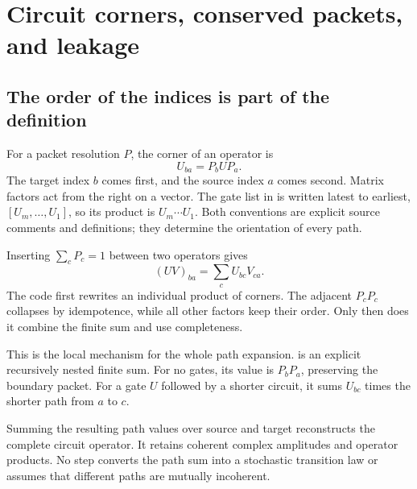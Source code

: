\section{Circuit corners, conserved packets, and leakage}
\label{sec:dynamics}

\subsection{The order of the indices is part of the definition}
For a packet resolution $P$, the corner of an operator is
\[
U_{ba}=P_bUP_a.
\]
The target index $b$ comes first, and the source index $a$ comes second. Matrix factors act from the right on a vector. The gate list in  is written latest to earliest, $[U_m,\ldots,U_1]$, so its product is $U_m\cdots U_1$. Both conventions are explicit source comments and definitions; they determine the orientation of every path.


Inserting $\sum_cP_c=1$ between two operators gives
\[
(UV)_{ba}=\sum_c U_{bc}V_{ca}.
\]
The code first rewrites an individual product of corners. The adjacent $P_cP_c$ collapses by idempotence, while all other factors keep their order. Only then does it combine the finite sum and use completeness.


This is the local mechanism for the whole path expansion.  is an explicit recursively nested finite sum. For no gates, its value is $P_bP_a$, preserving the boundary packet. For a gate $U$ followed by a shorter circuit, it sums $U_{bc}$ times the shorter path from $a$ to $c$.



Summing the resulting path values over source and target reconstructs the complete circuit operator. It retains coherent complex amplitudes and operator products. No step converts the path sum into a stochastic transition law or assumes that different paths are mutually incoherent.

